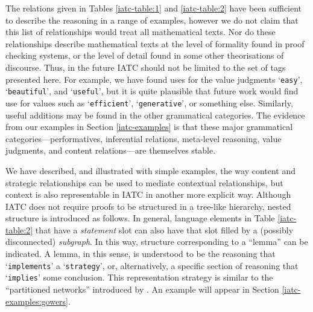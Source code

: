 \documentclass[smallextended,oneside]{svjour3}       %
\newcommand\nothing[1]{#1}
\let\paragraph\nothing
\begin{document}
\paragraph{The relations given in Tables \ref{iatc-table:1} and \ref{iatc-table:2} have been sufficient to describe the reasoning in a range of examples, however we do not claim that this list of relationships would treat all mathematical texts.}
Nor do these relationships describe mathematical texts at the
level of formality found in proof checking systems, or the level of
detail found in some other theorisations of discourse.
Thus, in the future IATC should not be limited to the set of tags presented here.
For example, we have found uses for the value judgments
`\texttt{easy}', `\texttt{beautiful}', and `\texttt{useful}', but it is
quite plausible that future work would find use for values such as
`\texttt{efficient}', `\texttt{generative}', or something else.
Similarly, useful additions may be found in the other grammatical categories.
The evidence from our examples in Section \ref{iatc-examples} is that
these major grammatical categories---performatives, inferential
relations, meta-level reasoning, value judgments, and content
relations---are themselves stable.

\paragraph{We have described, and illustrated with simple examples, the way content and strategic relationships can be used to mediate contextual relationships, but context is also representable in IATC in another more explicit way.}
Although IATC does not require proofs to be structured in a tree-like
hierarchy, nested structure is introduced as follows. 
In general, language elements in Table \ref{iatc-table:2}
that have a \emph{statement} slot can also have that slot filled by a
(possibly disconnected) \emph{subgraph}.  In this way, structure
corresponding to a ``lemma'' can be indicated.
A lemma, in this sense, is understood to be the reasoning that `\texttt{implements}' a
`\texttt{strategy}', or, alternatively, a specific section of reasoning
that `\texttt{implies}' some conclusion.   This representation strategy is similar to the ``partitioned
networks'' introduced by \citet{hendrix1975partitioned,hendrix1979encoding}.
An example will appear in Section \ref{iatc-examples:gowers}.
\end{document}
